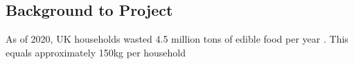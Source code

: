 \documentclass[../CHEFCookingHelperForEveryonesFridge.tex]{subfiles}
\begin{document}
\subsection{Background to Project}
As of 2020, UK households wasted 4.5 million tons of edible food per year \parencite{wrap_food_2020}. This equals
approximately 150kg per household \parencite{census_families_2022}
\end{document}
